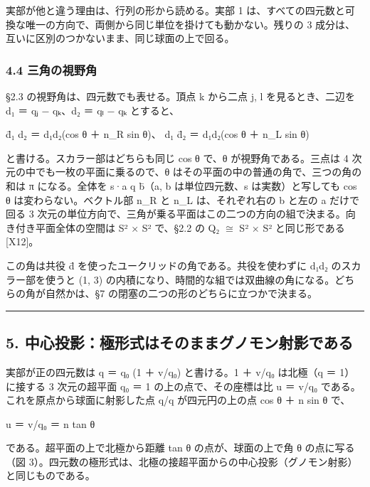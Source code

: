 \documentclass[
  a4paper,
]{ltjsarticle}
\begin{document}
実部が他と違う理由は、行列の形から読める。実部 1
は、すべての四元数と可換な唯一の方向で、両側から同じ単位を掛けても動かない。残りの
3 成分は、互いに区別のつかないまま、同じ球面の上で回る。

\subsubsection{4.4
三角の視野角}\label{ux4e09ux89d2ux306eux8996ux91ceux89d2}

§2.3 の視野角は、四元数でも表せる。頂点 k から二点 j, l
を見るとき、二辺を d₁ ＝ qⱼ − qₖ、d₂ ＝ qₗ − qₖ とすると、

d̄₁ d₂ ＝ \textbar d₁\textbar\textbar d₂\textbar(cos θ ＋ n\_R sin θ)、
d₁ d̄₂ ＝ \textbar d₁\textbar\textbar d₂\textbar(cos θ ＋ n\_L sin θ)

と書ける。スカラー部はどちらも同じ cos θ で、θ が視野角である。三点は 4
次元の中でも一枚の平面に乗るので、θ
はその平面の中の普通の角で、三つの角の和は π になる。全体を s·a q b̄（a,
b は単位四元数、s は実数）と写しても cos θ は変わらない。ベクトル部 n\_R
と n\_L は、それぞれ右の b と左の a だけで回る 3
次元の単位方向で、三角が乗る平面はこの二つの方向の組で決まる。向き付き平面全体の空間は
S² × S² で、§2.2 の Q₂ \(\cong\) S² × S² と同じ形である {[}X12{]}。

この角は共役 d̄ を使ったユークリッドの角である。共役を使わずに d₁d₂
のスカラー部を使うと (1, 3)
の内積になり、時間的な組では双曲線の角になる。どちらの角が自然かは、§7
の閉塞の二つの形のどちらに立つかで決まる。

\begin{center}\rule{0.5\linewidth}{0.5pt}\end{center}

\subsection{5.
中心投影：極形式はそのままグノモン射影である}\label{ux4e2dux5fc3ux6295ux5f71ux6975ux5f62ux5f0fux306fux305dux306eux307eux307eux30b0ux30ceux30e2ux30f3ux5c04ux5f71ux3067ux3042ux308b}

実部が正の四元数は q ＝ q₀ (1 ＋ v/q₀) と書ける。1 ＋ v/q₀ は北極（q ＝
1）に接する 3 次元の超平面 q₀ ＝ 1 の上の点で、その座標は比 u ＝ v/q₀
である。これを原点から球面に射影した点 q/\textbar q\textbar{}
が四元円の上の点 cos θ ＋ n sin θ で、

u ＝ v/q₀ ＝ n tan θ

である。超平面の上で北極から距離 tan θ の点が、球面の上で角 θ
の点に写る（図
3）。四元数の極形式は、北極の接超平面からの中心投影（グノモン射影）と同じものである。
\end{document}
